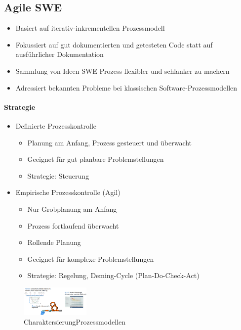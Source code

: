 \documentclass{article}
\begin{document}
\subsection{Agile SWE}
\begin{itemize}
    \item Basiert auf iterativ-inkrementellen Prozessmodell
    \item Fokussiert auf gut dokumentierten und getesteten Code statt auf ausführlicher Dokumentation
    \item Sammlung von Ideen SWE Prozess flexibler und schlanker zu machern
    \item Adressiert bekannten Probleme bei klassischen Software-Prozessmodellen
\end{itemize}

\paragraph{Strategie}
\begin{itemize}
    \item Definierte Prozesskontrolle
    \begin{itemize}
        \item Planung am Anfang, Prozess gesteuert und überwacht
        \item Geeignet für gut planbare Problemstellungen
        \item Strategie: Steuerung
    \end{itemize}
    \item Empirische Prozesskontrolle (Agil)
    \begin{itemize}
        \item Nur Grobplanung am Anfang
        \item Prozess fortlaufend überwacht
        \item Rollende Planung
        \item Geeignet für komplexe Problemstellungen
        \item Strategie: Regelung, Deming-Cycle (Plan-Do-Check-Act)
    \end{itemize}
\end{itemize}

\begin{figure}[H]
\centering
\includegraphics[width=0.3\textwidth]{Resources/Images/CharaktersierungProzessmodellen.png}
\caption{\label{fig:CharaktersierungProzessmodellen}CharaktersierungProzessmodellen}
\end{figure}
\end{document}

